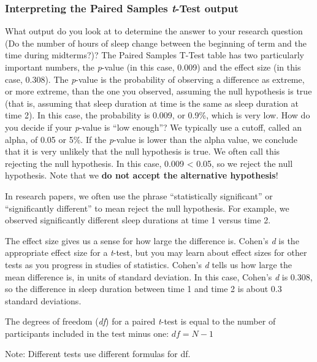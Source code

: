 \documentclass[
]{book}
\begin{document}
\hypertarget{interpreting-the-paired-samples-t-test-output}{%
\subsubsection{\texorpdfstring{Interpreting the Paired Samples \emph{t}-Test output}{Interpreting the Paired Samples t-Test output}}\label{interpreting-the-paired-samples-t-test-output}}

What output do you look at to determine the answer to your research question (Do the number of hours of sleep change between the beginning of term and the time during midterms?)? The Paired Samples T-Test table has two particularly important numbers, the \emph{p}-value (in this case, 0.009) and the effect size (in this case, 0.308). The \emph{p}-value is the probability of observing a difference as extreme, or more extreme, than the one you observed, assuming the null hypothesis is true (that is, assuming that sleep duration at time is the same as sleep duration at time 2). In this case, the probability is 0.009, or 0.9\%, which is very low. How do you decide if your \emph{p}-value is ``low enough''? We typically use a cutoff, called an alpha, of 0.05 or 5\%. If the \emph{p}-value is lower than the alpha value, we conclude that it is very unlikely that the null hypothesis is true. We often call this rejecting the null hypothesis. In this case, 0.009 \textless{} 0.05, so we reject the null hypothesis. Note that we \textbf{do not accept the alternative hypothesis}!

In research papers, we often use the phrase ``statistically significant'' or ``significantly different'' to mean reject the null hypothesis. For example, we observed significantly different sleep durations at time 1 versus time 2.

The effect size gives us a sense for how large the difference is. Cohen's \emph{d} is the appropriate effect size for a \emph{t}-test, but you may learn about effect sizes for other tests as you progress in studies of statistics. Cohen's \emph{d} tells us how large the mean difference is, in units of standard deviation. In this case, Cohen's \emph{d} is 0.308, so the difference in sleep duration between time 1 and time 2 is about 0.3 standard deviations.

The degrees of freedom (\emph{df}) for a paired \emph{t}-test is equal to the number of participants included in the test minus one:
\(df = N - 1\)

Note: Different tests use different formulas for df.
\end{document}
